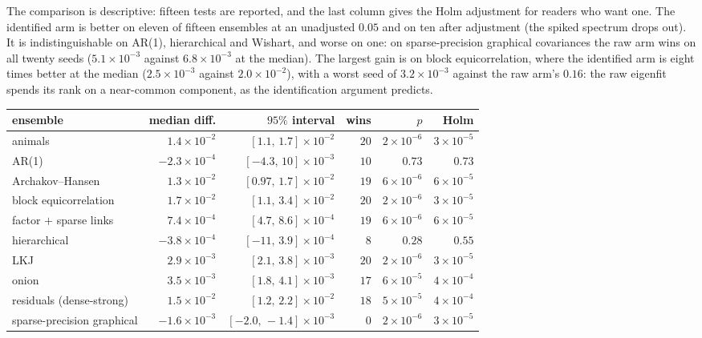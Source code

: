 \documentclass[11pt]{article}
\begin{document}
The comparison is descriptive: fifteen tests are reported, and the last
column gives the Holm adjustment for readers who want one. The identified
arm is better on eleven of fifteen ensembles at an unadjusted $0.05$ and
on ten after adjustment (the spiked spectrum drops out). It is
indistinguishable on AR(1), hierarchical and Wishart, and
worse on one: on sparse-precision graphical covariances the raw arm wins
on all twenty seeds ($5.1\times10^{-3}$ against $6.8\times10^{-3}$ at the
median). The largest gain is on block equicorrelation, where the
identified arm is eight times better at the median ($2.5\times10^{-3}$
against $2.0\times10^{-2}$), with a worst seed of $3.2\times10^{-3}$
against the raw arm's $0.16$: the raw eigenfit spends its rank on a
near-common component, as the identification argument predicts.

\begin{table}[h]\centering\footnotesize
\setlength{\tabcolsep}{4pt}
\begin{tabular}{lrrrrr}
\toprule
ensemble & median diff. & $95\%$ interval & wins & $p$ & Holm \\
\midrule
animals & $1.4\times10^{-2}$ & $[1.1,\,1.7]\times10^{-2}$ & $20$ & $2\times10^{-6}$ & $3\times10^{-5}$\\
AR(1) & $-2.3\times10^{-4}$ & $[-4.3,\,10]\times10^{-3}$ & $10$ & $0.73$ & $0.73$\\
Archakov--Hansen & $1.3\times10^{-2}$ & $[0.97,\,1.7]\times10^{-2}$ & $19$ & $6\times10^{-6}$ & $6\times10^{-5}$\\
block equicorrelation & $1.7\times10^{-2}$ & $[1.1,\,3.4]\times10^{-2}$ & $20$ & $2\times10^{-6}$ & $3\times10^{-5}$\\
factor $+$ sparse links & $7.4\times10^{-4}$ & $[4.7,\,8.6]\times10^{-4}$ & $19$ & $6\times10^{-6}$ & $6\times10^{-5}$\\
hierarchical & $-3.8\times10^{-4}$ & $[-11,\,3.9]\times10^{-4}$ & $8$ & $0.28$ & $0.55$\\
LKJ & $2.9\times10^{-3}$ & $[2.1,\,3.8]\times10^{-3}$ & $20$ & $2\times10^{-6}$ & $3\times10^{-5}$\\
onion & $3.5\times10^{-3}$ & $[1.8,\,4.1]\times10^{-3}$ & $17$ & $6\times10^{-5}$ & $4\times10^{-4}$\\
residuals (dense-strong) & $1.5\times10^{-2}$ & $[1.2,\,2.2]\times10^{-2}$ & $18$ & $5\times10^{-5}$ & $4\times10^{-4}$\\
sparse-precision graphical & $-1.6\times10^{-3}$ & $[-2.0,\,-1.4]\times10^{-3}$ & $0$ & $2\times10^{-6}$ & $3\times10^{-5}$\\

\end{tabular}
\end{table}
\end{document}
